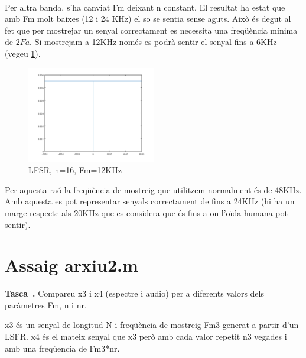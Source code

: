 \documentclass[11pt]{report}
\newcounter{previCounter}
\newenvironment{enunciat}{
  \stepcounter{previCounter}
  \par\vspace{\baselineskip}\noindent
  {\bf Tasca~\thepreviCounter.}}{\par\medskip\ignorespacesafterend}
\begin{document}
\paragraph{}
Per altra banda, s'ha canviat Fm deixant n constant. El resultat ha estat que amb Fm molt baixes (12 i 24 KHz) el so se sentia sense aguts.
Això és degut al fet que per mostrejar un senyal correctament es necessita una freqüència mínima de $2Fa$. Si mostrejam a 12KHz només es podrà sentir el senyal fins a 6KHz (vegeu \ref{fig:Fm12}).
\begin{figure}[h]
\label{fig:Fm12}
  \centering
  \includegraphics[width=0.5\textwidth]{img/Fm12}
  \caption{LFSR, n=16, Fm=12KHz}
\end{figure}
Per aquesta raó la freqüència de mostreig que utilitzem normalment és de 48KHz. Amb aquesta es pot representar senyals correctament de fins a 24KHz (hi ha un marge respecte als 20KHz que es considera que és fins a on l'oïda humana pot sentir).
\newpage
\section*{Assaig arxiu2.m}
\begin{enunciat}
     Compareu x3  i x4 (espectre i audio) per a diferents valors dels paràmetres Fm, n i nr.
\end{enunciat}
x3 és un senyal de longitud N i freqüència de mostreig Fm3 generat a partir d'un LSFR. 
x4 és el mateix senyal que x3 però amb cada valor repetit n3 vegades i amb una freqüencia de Fm3*nr.
\end{document}
